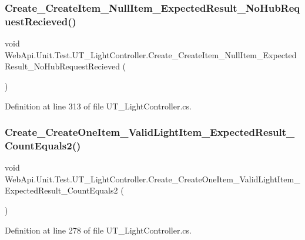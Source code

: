 \subsubsection{\texorpdfstring{Create\+\_\+\+Create\+Item\+\_\+\+Null\+Item\+\_\+\+Expected\+Result\+\_\+\+No\+Hub\+Request\+Recieved()}{Create\_CreateItem\_NullItem\_ExpectedResult\_NoHubRequestRecieved()}}
{\footnotesize\ttfamily void Web\+Api.\+Unit.\+Test.\+U\+T\+\_\+\+Light\+Controller.\+Create\+\_\+\+Create\+Item\+\_\+\+Null\+Item\+\_\+\+Expected\+Result\+\_\+\+No\+Hub\+Request\+Recieved (\begin{DoxyParamCaption}{ }\end{DoxyParamCaption})}



Definition at line 313 of file U\+T\+\_\+\+Light\+Controller.\+cs.

\mbox{\label{class_web_api_1_1_unit_1_1_test_1_1_u_t___light_controller_ad8462e1a8991ef7f7ea86a852fb5a22f}} 
\subsubsection{\texorpdfstring{Create\+\_\+\+Create\+One\+Item\+\_\+\+Valid\+Light\+Item\+\_\+\+Expected\+Result\+\_\+\+Count\+Equals2()}{Create\_CreateOneItem\_ValidLightItem\_ExpectedResult\_CountEquals2()}}
{\footnotesize\ttfamily void Web\+Api.\+Unit.\+Test.\+U\+T\+\_\+\+Light\+Controller.\+Create\+\_\+\+Create\+One\+Item\+\_\+\+Valid\+Light\+Item\+\_\+\+Expected\+Result\+\_\+\+Count\+Equals2 (\begin{DoxyParamCaption}{ }\end{DoxyParamCaption})}



Definition at line 278 of file U\+T\+\_\+\+Light\+Controller.\+cs.

